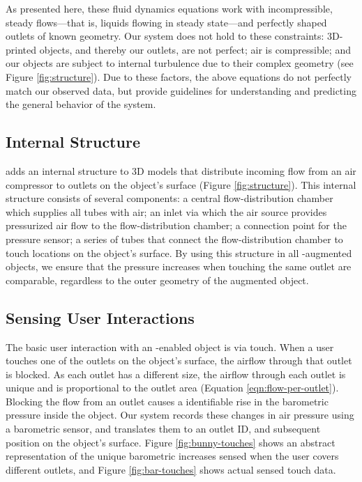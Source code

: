 				As presented here, these fluid dynamics equations work with
				incompressible, steady flows---that is, liquids flowing in steady
				state---and perfectly shaped outlets of known geometry. Our system does
				not hold to these constraints: 3D-printed objects, and thereby our
				outlets, are not perfect; air is compressible; and our objects are subject
				to internal turbulence due to their complex geometry (see
				Figure \ref{fig:structure}). Due to these factors, the above equations do not
				perfectly match our observed data, but provide guidelines for
				understanding and predicting the general behavior of the system.

			\subsection{Internal Structure}
				\at adds an internal structure to 3D models that distribute incoming flow
				from an air compressor to outlets on the object's surface
				(Figure \ref{fig:structure}). This internal structure consists of several
				components: a central flow-distribution chamber which supplies all tubes
				with air; an inlet via which the air source provides pressurized air flow
				to the flow-distribution chamber; a connection point for the pressure
				sensor; a series of tubes that connect the flow-distribution chamber to
				touch locations on the object's surface. By using this structure in all
				\at-augmented objects, we ensure that the pressure increases when touching
				the same outlet are comparable, regardless to the outer geometry of the
				augmented object.

			\subsection{Sensing User Interactions}
				The basic user interaction with an \at-enabled object is via touch. When a
				user touches one of the outlets on the object's surface, the airflow
				through that outlet is blocked. As each outlet has a different size, the
				airflow through each outlet is unique and is proportional to the outlet
				area (Equation \ref{eqn:flow-per-outlet}). Blocking the flow from an outlet causes
				a identifiable rise in the barometric pressure inside the object. Our
				system records these changes in air pressure using a barometric sensor,
				and translates them to an outlet ID, and subsequent position on the
				object's surface. Figure \ref{fig:bunny-touches} shows an abstract
				representation of the unique barometric increases sensed when the user
				covers different outlets, and Figure \ref{fig:bar-touches} shows actual sensed
				touch data.

